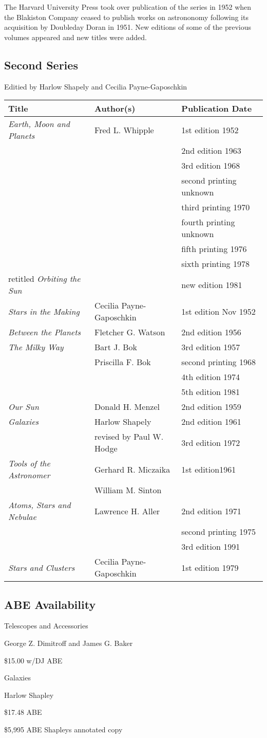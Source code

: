 The Harvard University Press took over publication of the series in
1952 when the Blakiston Company ceased to publish works on astrononomy
following its acquisition by Doubleday Doran in 1951. New editions of
some of the previous volumes appeared and new titles were added.

\subsection{Second Series}

Editied by Harlow Shapely and Cecilia Payne-Gaposchkin

\begin{tabular}{l l l}
  Title & Author(s) & Publication Date \\ \hline
  {\it Earth, Moon and Planets} & Fred L. Whipple & 1st edition 1952 \\
  & & 2nd edition 1963 \\
  & & 3rd edition 1968 \\
  & & second printing unknown \\
  & & third printing 1970 \\
  & & fourth printing unknown \\
  & & fifth printing 1976 \\
  & & sixth printing 1978 \\
  retitled {\it Orbiting the Sun} & & new edition  1981 \\ \hline
  {\it Stars in the Making} & Cecilia Payne-Gaposchkin & 1st edition Nov 1952 \\ \hline
  {\it Between the Planets} & Fletcher G. Watson & 2nd edition 1956 \\ \hline
  {\it The Milky Way} & Bart J. Bok & 3rd edition 1957 \\
  & Priscilla F. Bok & second printing 1968 \\
  & & 4th edition 1974 \\
  & & 5th edition 1981 \\ \hline
  {\it Our Sun} & Donald H. Menzel & 2nd edition 1959 \\ \hline
  {\it Galaxies} & Harlow Shapely & 2nd edition 1961 \\
  & revised by Paul W. Hodge & 3rd edition 1972 \\ \hline
  {\it Tools of the Astronomer} & Gerhard R. Miczaika & 1st edition1961 \\
  & William M. Sinton & \\ \hline
  {\it Atoms, Stars and Nebulae} & Lawrence H. Aller & 2nd edition 1971 \\
  & & second printing 1975 \\
  & & 3rd edition 1991 \\ \hline
  {\it Stars and Clusters} & Cecilia Payne-Gaposchkin & 1st edition 1979 \\ \hline
\end{tabular}

\subsection{ABE Availability}

Telescopes and Accessories

George Z. Dimitroff and James G. Baker

\$15.00 w/DJ ABE
  

Galaxies

Harlow Shapley

\$17.48 ABE

\$5,995 ABE Shapleys annotated copy
